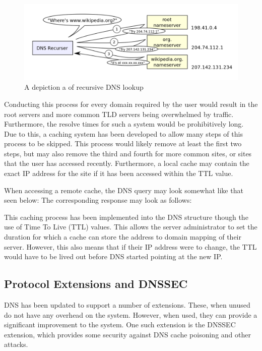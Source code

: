 			\begin{figure}[htb]
				\centering
					\includegraphics[scale=0.27]{./DNSRecursor.png}
					\caption{A depiction a of recursive DNS lookup}
					\label{fig:DNSRecursor}
			\end{figure}

			Conducting this process for every domain required by the user would result in the root servers and more common TLD servers being overwhelmed by traffic.
			Furthermore, the resolve times for such a system would be prohibitively long.
			Due to this, a caching system has been developed to allow many steps of this process to be skipped.
			This process would likely remove at least the first two steps, but may also remove the third and fourth for more common sites, or sites that the user has accessed recently.
			Furthermore, a local cache may contain the exact IP address for the site if it has been accessed within the TTL value.

			When accessing a remote cache, the DNS query may look somewhat like that seen below:
			The corresponding response may look as follows:

			This caching process has been implemented into the DNS structure though the use of Time To Live (TTL) values.
			This allows the server administrator to set the duration for which a cache can store the address to domain mapping of their server.
			However, this also means that if their IP address were to change, the TTL would have to be lived out before DNS started pointing at the new IP.
		\subsection{Protocol Extensions and DNSSEC}
			DNS has been updated to support a number of extensions.
			These, when unused do not have any overhead on the system.
			However, when used, they can provide a significant improvement to the system.
			One such extension is the DNSSEC extension, which provides some security against DNS cache poisoning and other attacks.

